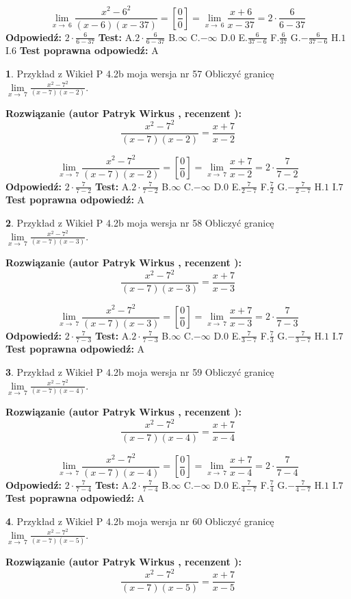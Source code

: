 \documentclass[12pt, a4paper]{article}
\theoremstyle{definition} %
\newtheorem{zad}{}
\newcommand{\zadStart}[1]{\begin{zad}#1\newline}
\newcommand{\zadStop}{\end{zad}}
\newcommand{\rozwStart}[2]{\noindent \textbf{Rozwiązanie (autor #1 , recenzent #2): }\newline}
\newcommand{\rozwStop}{\newline}
\newcommand{\odpStart}{\noindent \textbf{Odpowiedź:}\newline}
\newcommand{\odpStop}{\newline}
\newcommand{\testStart}{\noindent \textbf{Test:}\newline}
\newcommand{\testStop}{\newline}
\newcommand{\kluczStart}{\noindent \textbf{Test poprawna odpowiedź:}\newline}
\newcommand{\kluczStop}{\newline}
\begin{document}
$$\lim\limits_{x\to\ 6}\frac{x^{2}-6^{2}}{(x-6)(x-37)}=[\frac{0}{0}]=\lim\limits_{x\to\ 6}\frac{x+6}{x-37}=2 \cdot \frac{6}{6-37}$$
\rozwStop
\odpStart
$2 \cdot \frac{6}{6-37}$
\odpStop
\testStart
A.$2 \cdot \frac{6}{6-37}$
B.$\infty$
C.$-\infty$
D.$0$
E.$\frac{6}{37-6}$
F.$\frac{6}{37}$
G.$-\frac{6}{37-6}$
H.$1$
I.$6$
\testStop
\kluczStart
A
\kluczStop



\zadStart{Przykład z Wikieł P 4.2b moja wersja nr 57}
Obliczyć granicę $\lim\limits_{x\to\ 7}\frac{x^{2}-7^{2}}{(x-7)(x-2)}$.
\zadStop
\rozwStart{Patryk Wirkus}{}
$$\frac{x^{2}-7^{2}}{(x-7)(x-2)}=\frac{x+7}{x-2}$$

$$\lim\limits_{x\to\ 7}\frac{x^{2}-7^{2}}{(x-7)(x-2)}=[\frac{0}{0}]=\lim\limits_{x\to\ 7}\frac{x+7}{x-2}=2 \cdot \frac{7}{7-2}$$
\rozwStop
\odpStart
$2 \cdot \frac{7}{7-2}$
\odpStop
\testStart
A.$2 \cdot \frac{7}{7-2}$
B.$\infty$
C.$-\infty$
D.$0$
E.$\frac{7}{2-7}$
F.$\frac{7}{2}$
G.$-\frac{7}{2-7}$
H.$1$
I.$7$
\testStop
\kluczStart
A
\kluczStop



\zadStart{Przykład z Wikieł P 4.2b moja wersja nr 58}
Obliczyć granicę $\lim\limits_{x\to\ 7}\frac{x^{2}-7^{2}}{(x-7)(x-3)}$.
\zadStop
\rozwStart{Patryk Wirkus}{}
$$\frac{x^{2}-7^{2}}{(x-7)(x-3)}=\frac{x+7}{x-3}$$

$$\lim\limits_{x\to\ 7}\frac{x^{2}-7^{2}}{(x-7)(x-3)}=[\frac{0}{0}]=\lim\limits_{x\to\ 7}\frac{x+7}{x-3}=2 \cdot \frac{7}{7-3}$$
\rozwStop
\odpStart
$2 \cdot \frac{7}{7-3}$
\odpStop
\testStart
A.$2 \cdot \frac{7}{7-3}$
B.$\infty$
C.$-\infty$
D.$0$
E.$\frac{7}{3-7}$
F.$\frac{7}{3}$
G.$-\frac{7}{3-7}$
H.$1$
I.$7$
\testStop
\kluczStart
A
\kluczStop



\zadStart{Przykład z Wikieł P 4.2b moja wersja nr 59}
Obliczyć granicę $\lim\limits_{x\to\ 7}\frac{x^{2}-7^{2}}{(x-7)(x-4)}$.
\zadStop
\rozwStart{Patryk Wirkus}{}
$$\frac{x^{2}-7^{2}}{(x-7)(x-4)}=\frac{x+7}{x-4}$$

$$\lim\limits_{x\to\ 7}\frac{x^{2}-7^{2}}{(x-7)(x-4)}=[\frac{0}{0}]=\lim\limits_{x\to\ 7}\frac{x+7}{x-4}=2 \cdot \frac{7}{7-4}$$
\rozwStop
\odpStart
$2 \cdot \frac{7}{7-4}$
\odpStop
\testStart
A.$2 \cdot \frac{7}{7-4}$
B.$\infty$
C.$-\infty$
D.$0$
E.$\frac{7}{4-7}$
F.$\frac{7}{4}$
G.$-\frac{7}{4-7}$
H.$1$
I.$7$
\testStop
\kluczStart
A
\kluczStop



\zadStart{Przykład z Wikieł P 4.2b moja wersja nr 60}
Obliczyć granicę $\lim\limits_{x\to\ 7}\frac{x^{2}-7^{2}}{(x-7)(x-5)}$.
\zadStop
\rozwStart{Patryk Wirkus}{}
$$\frac{x^{2}-7^{2}}{(x-7)(x-5)}=\frac{x+7}{x-5}$$
\end{document}
